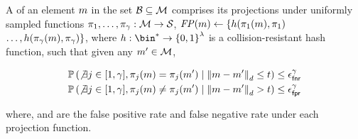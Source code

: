 \begin{definition}
	A \projectionPrimitive of an element $\genericMetricSpaceElmt$ in the set $\blocklist \subseteq \metricSpace$ 
	comprises its projections under uniformly sampled functions $\projFn[1], 
	\dots, \projFn[\numProjections]: \metricSpace \rightarrow \projectedSpace$, $\fingerprint(\genericMetricSpaceElmt) \assign 
	\{\hashFn(\projFn[1](\genericMetricSpaceElmt), \projFn[1])$ $\dots, \hashFn(\projFn[\numProjections](\genericMetricSpaceElmt), \projFn[\numProjections])\}$, where $\hashFn: \bin^{\ast} \rightarrow \setDefn{0,1}^{\secParam}$ is a collision-resistant hash function, such that given any 
$\genericMetricSpaceElmtAlt \in \metricSpace$,
		
		\begin{small}
		\begin{align}
			& \cprob{}{\not\exists \projIdx \in \nats[1][\numProjections], 
				\projFn[\projIdx](\genericMetricSpaceElmt) = \projFn[\projIdx](\genericMetricSpaceElmtAlt)}{\distanceNotation[\distance][\genericMetricSpaceElmt][\genericMetricSpaceElmtAlt] \le 
			\threshold} \le \fnr^{\numProjections} \label{eq:no_false_neg} \\
			& \cprob{}{\not\exists \projIdx \in \nats[1][\numProjections], 
				\projFn[\projIdx](\genericMetricSpaceElmt) \neq \projFn[\projIdx](\genericMetricSpaceElmtAlt)}{\distanceNotation[\distance][\genericMetricSpaceElmt][\genericMetricSpaceElmtAlt] > 
			\threshold} \le \fpr^{\numProjections} \label{eq:no_false_pos}
		\end{align}
		\end{small}
where,  \fpr and \fnr are the false positive rate and false negative rate under each projection function. 
		

		

\end{definition}

